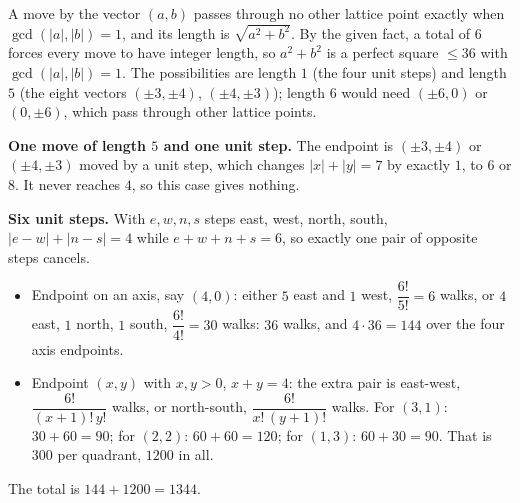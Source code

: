 A move by the vector $(a,b)$ passes through no other lattice point exactly when $\gcd(|a|,|b|)=1$, and its length is $\sqrt{a^2+b^2}$. By the given fact, a total of $6$ forces every move to have integer length, so $a^2+b^2$ is a perfect square $\le36$ with $\gcd(|a|,|b|)=1$. The possibilities are length $1$ (the four unit steps) and length $5$ (the eight vectors $(\pm3,\pm4)$, $(\pm4,\pm3)$); length $6$ would need $(\pm6,0)$ or $(0,\pm6)$, which pass through other lattice points.

\textbf{One move of length $5$ and one unit step.} The endpoint is $(\pm3,\pm4)$ or $(\pm4,\pm3)$ moved by a unit step, which changes $|x|+|y|=7$ by exactly $1$, to $6$ or $8$. It never reaches $4$, so this case gives nothing.

\textbf{Six unit steps.} With $e,w,n,s$ steps east, west, north, south, $|e-w|+|n-s|=4$ while $e+w+n+s=6$, so exactly one pair of opposite steps cancels.
\begin{itemize}
\item Endpoint on an axis, say $(4,0)$: either $5$ east and $1$ west, $\dfrac{6!}{5!}=6$ walks, or $4$ east, $1$ north, $1$ south, $\dfrac{6!}{4!}=30$ walks: $36$ walks, and $4\cdot36=144$ over the four axis endpoints.
\item Endpoint $(x,y)$ with $x,y>0$, $x+y=4$: the extra pair is east-west, $\dfrac{6!}{(x+1)!\,y!}$ walks, or north-south, $\dfrac{6!}{x!\,(y+1)!}$ walks. For $(3,1)$: $30+60=90$; for $(2,2)$: $60+60=120$; for $(1,3)$: $60+30=90$. That is $300$ per quadrant, $1200$ in all.
\end{itemize}
The total is $144+1200=\boxed{1344}$.
